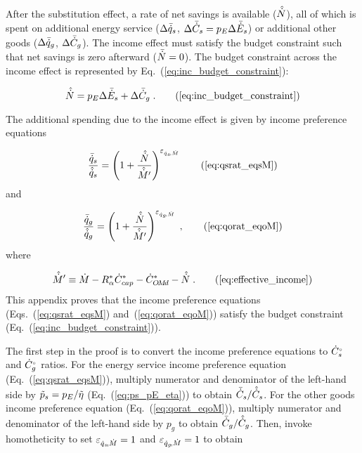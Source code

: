 

After the substitution effect, 
a rate of net savings is available ($\hat{\dot{N}}$), 
all of which is spent on
additional energy service ($\Delta \bar{\dot{q}}_s$, $\Delta \bar{\dot{C}}_s = p_E \Delta \bar{\dot{E}}_s$) or 
additional other goods ($\Delta \bar{\dot{q}}_g$, $\Delta \bar{\dot{C}}_g$).
The income effect must satisfy the budget constraint
such that net savings is zero afterward ($\bar{\dot{N}} = 0$).
The budget constraint across the income effect 
is represented by Eq.~(\ref{eq:inc_budget_constraint}): 

\begin{equation}
  \rbinc{N} = p_E \Delta \rainc{E}_s + \Delta \rainc{C}_g \; . \tag{\ref{eq:inc_budget_constraint}}
\end{equation}

The additional spending due to the income effect is given by income preference equations

\begin{equation}
  \frac{\rainc{q}_s}{\rbinc{q}_s} = \left( 1 + \frac{\rbinc{N}}{\Mdothatprime}  \right) ^{\eqsM} 
                                                                \tag{\ref{eq:qsrat_eqsM}}
\end{equation}
%
and

\begin{equation}
  \frac{\rainc{q}_g}{\rbinc{q}_g} = \left( 1 + \frac{\rbinc{N}}{\Mdothatprime}  \right) ^{\eqoM} \; ,
                                                                \tag{\ref{eq:qorat_eqoM}}
\end{equation}
%
where

\begin{equation}
  \effinceqn \; . \tag{\ref{eq:effective_income}}
\end{equation}
%
This appendix proves that the income preference equations 
(Eqs.~(\ref{eq:qsrat_eqsM}) and~(\ref{eq:qorat_eqoM}))
satisfy the budget constraint (Eq.~(\ref{eq:inc_budget_constraint})).

The first step in the proof is to convert 
the income preference equations
to ${}{\dot{C}}^{\scriptscriptstyle \circ}_s$ and ${}{\dot{C}}^{\scriptscriptstyle \circ}_g$ ratios.
For the energy service income preference equation (Eq.~(\ref{eq:qsrat_eqsM})), 
multiply numerator and denominator of the left-hand side by $\tilde{p}_s = p_E / \tilde{\eta}$
(Eq.~(\ref{eq:ps_pE_eta}))
to obtain $\bar{\dot{C}}_s / \hat{\dot{C}}_s$.
For the other goods income preference equation (Eq.~(\ref{eq:qorat_eqoM})), 
multiply numerator and denominator of the left-hand side by $p_g$
to obtain $\bar{\dot{C}}_g / \hat{\dot{C}}_g$.
Then, invoke homotheticity to set $\varepsilon_{\dot{q}_s\!,\dot{M}} = 1$ and $\varepsilon_{\dot{q}_g\!,\dot{M}} = 1$ to obtain

